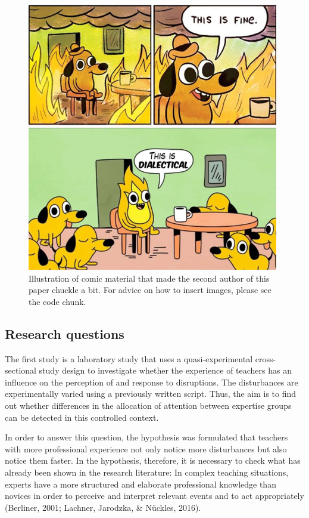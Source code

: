 \documentclass[
  english,
  man,floatsintext]{apa6}
\begin{document}
\begin{figure}

{\centering \includegraphics{./pictures/thisisdialectical} 

}

\caption{Illustration of comic material that made the second author of this paper chuckle a bit. For advice on how to insert images, please see the code chunk.}\label{fig:dialectical}
\end{figure}

\hypertarget{research-questions}{%
\subsection{Research questions}\label{research-questions}}

The first study is a laboratory study that uses a quasi-experimental cross-sectional study design to investigate whether the experience of teachers has an influence on the perception of and response to disruptions. The disturbances are experimentally varied using a previously written script. Thus, the aim is to find out whether differences in the allocation of attention between expertise groups can be detected in this controlled context.

In order to answer this question, the hypothesis was formulated that teachers with more professional experience not only notice more disturbances but also notice them faster. In the hypothesis, therefore, it is necessary to check what has already been shown in the research literature: In complex teaching situations, experts have a more structured and elaborate professional knowledge than novices in order to perceive and interpret relevant events and to act appropriately (Berliner, 2001; Lachner, Jarodzka, \& Nückles, 2016).
\end{document}
